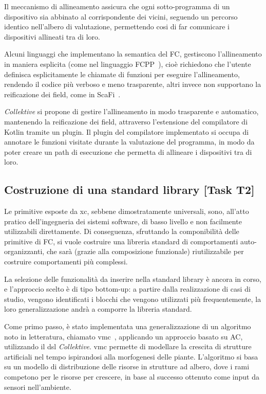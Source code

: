 \documentclass[13pt, a4paper]{article}
\newcommand{\ck}{\emph{Collektive}}
\begin{document}
Il meccanismo di allineamento assicura che ogni sotto-programma di un dispositivo sia abbinato al corrispondente dei vicini,
    seguendo un percorso identico nell'albero di valutazione,
    permettendo cosi di far comunicare i dispositivi allineati tra di loro.

Alcuni linguaggi che implementano la semantica del \ac{FC}, gestiscono l'allineamento in maniera esplicita (come nel linguaggio FCPP~\cite{fcpp}),
cioè richiedono che l'utente definisca esplicitamente le chiamate di funzioni per eseguire l'allineamento,
rendendo il codice più verboso e meno trasparente,
altri invece non supportano la reificazione dei field, come in ScaFi~\cite{scafi}.

\ck{} si propone di gestire l'allineamento in modo trasparente e automatico, mantenendo la reificazione dei field,
attraverso l'estensione del compilatore di Kotlin tramite un plugin.
%
Il plugin del compilatore implementato si occupa di annotare le funzioni visitate durante la valutazione del programma,
in modo da poter creare un path di esecuzione che permetta di allineare i dispositivi tra di loro.

\subsection{Costruzione di una standard library [Task T2]}\label{subsec:task-t2-[costruzione-di-una-standard-library]}

Le primitive esposte da \ac{xc}, sebbene dimostratamente universali,
sono, all'atto pratico dell'ingegneria dei sistemi software,
di basso livello e non facilmente utilizzabili direttamente.
%
Di conseguenza, sfruttando la componibilità delle primitive di \ac{FC},
si vuole costruire una libreria standard di comportamenti auto-organizzanti,
che sarà (grazie alla composizione funzionale) riutilizzabile per costruire comportamenti più complessi.

La selezione delle funzionalità da inserire nella standard library
è ancora in corso,
e l'approccio scelto è di tipo bottom-up:
a partire dalla realizzazione di casi di studio,
vengono identificati i blocchi che vengono utilizzati più frequentemente,
la loro generalizzazione andrà a comporre la libreria standard.

Come primo passo,
è stato implementata una generalizzazione di un algoritmo noto in letteratura,
chiamato \ac{vmc}~\cite{ZahadatHS17},
applicando un approccio basato su \ac{AC}, utilizzando il \ac{dsl} \ck{}.
%
\ac{vmc} permette di modellare la crescita di strutture artificiali nel tempo ispirandosi alla morfogenesi delle piante.
%
L'algoritmo si basa su un modello di distribuzione delle risorse in strutture ad albero,
    dove i rami competono per le risorse per crescere, in base al successo ottenuto come input da sensori nell'ambiente.
\end{document}
